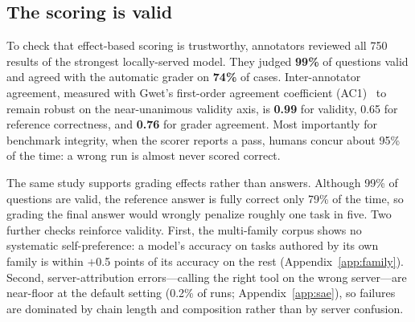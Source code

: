 \subsection{The scoring is valid}
\label{sec:results:validity}

To check that effect-based scoring is trustworthy, annotators reviewed all 750
results of the strongest locally-served model. They judged \textbf{99\%} of
questions valid and agreed with the automatic grader on \textbf{74\%} of
cases. Inter-annotator agreement, measured with Gwet's first-order agreement
coefficient (AC1)~\citep{gwet2008} to remain robust on the near-unanimous
validity axis, is \textbf{0.99} for validity, 0.65 for reference correctness,
and \textbf{0.76} for grader agreement. Most importantly for benchmark
integrity, when the scorer reports a pass, humans concur about 95\% of the
time: a wrong run is almost never scored correct.

The same study supports grading effects rather than answers. Although 99\% of
questions are valid, the reference answer is fully correct only 79\% of the
time, so grading the final answer would wrongly penalize roughly one task in
five. Two further checks reinforce validity. First, the multi-family corpus
shows no systematic self-preference: a model's accuracy on tasks authored by
its own family is within \(+\)0.5 points of its accuracy on the rest
(Appendix~\ref{app:family}). Second, server-attribution errors---calling the
right tool on the wrong server---are near-floor at the default setting (0.2\%
of runs; Appendix~\ref{app:sae}), so failures are dominated by chain length
and composition rather than by server confusion.
